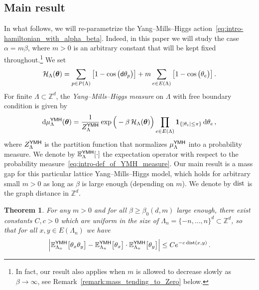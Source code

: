 \documentclass[11pt]{article}
\newtheorem{theorem}{Theorem}
\theoremstyle{definition}
\theoremstyle{remark}
\numberwithin{theorem}{section}
\newcommand{\bZ}{\mathbb Z}
\newcommand{\bE}{\mathbb E}
\newcommand{\Z}{\mathbb{Z}}
\newcommand{\one}{\boldsymbol{1}}
\begin{document}
    \subsection{Main result}
    In what follows, we will re-parametrize the Yang--Mills--Higgs action~\eqref{eq:intro-hamiltonian_with_alpha_beta}. Indeed, in this paper we will study the case $\alpha = m \beta$, where $m>0$ is an arbitrary constant that will be kept fixed throughout.\footnote{In fact, our result also applies when $m$ is allowed to decrease slowly as $\beta\to\infty$, see Remark~\ref{remark:mass_tending_to_Zero} below.}
    We set
    \begin{equation}
        \label{eq:intro_hamiltoniam_with_beta_and_mass}
        \mathcal{H}_{\Lambda}(\boldsymbol{\theta}) = \sum_{p\in P(\Lambda)} \big[1 - \cos\big({\sf d} \theta_p\big)\big] + m \sum_{e\in E(\Lambda)} \big[1- \cos\big(\theta_e\big)\big] \, .  
    \end{equation}
    For finite $\Lambda\subset \Z^d$, the \emph{Yang--Mills--Higgs measure} on $\Lambda$ with free boundary condition is given by
    \begin{equation}
        \label{eq:intro-def_of_YMH_measure}
        {\rm d}\mu_{\Lambda}^{\sf YMH}(\boldsymbol{\theta}) =  \frac{1}{Z_{\Lambda}^{\sf YMH}} \exp\Big(-\beta \, \mathcal{H}_{\Lambda}(\boldsymbol{\theta})\Big) \prod_{e\in E(\Lambda)} \one_{\{|\theta_e| \le \pi\}} \, {\rm d}\theta_e \, ,
    \end{equation}
    where $Z_{\Lambda}^{\sf YMH}$ is the partition function that normalizes $\mu_{\Lambda}^{\sf YMH}$ into a probability measure. We denote by $\bE_{\Lambda}^{\sf YMH}[\cdot]$ the expectation operator with respect to the probability measure~\eqref{eq:intro-def_of_YMH_measure}. Our main result is a mass gap for this particular lattice Yang--Mills--Higgs model, which holds for arbitrary small $m>0$ as long as $\beta$ is large enough (depending on $m$). We denote by $\text{\normalfont dist}$ is the graph distance in $\bZ^d$.
    \begin{theorem}
        \label{thm:exponential_clustering_in_lattice_YMH}
        For any $m>0$ and for all $\beta\ge \beta_0(d,m)$ large enough, there exist constants $C,c>0$ which are uniform in the size of $\Lambda_n = \{-n,\ldots,n\}^d \subset \bZ^d$, so that for all $x,y\in E(\Lambda_n)$ we have
        \[
        \Big|\bE_{\Lambda_n}^{\sf YMH}\big[\theta_x \theta_y\big] - \bE_{\Lambda_n}^{\sf YMH}\big[\theta_x \big]\cdot \bE_{\Lambda_n}^{\sf YMH}\big[ \theta_y\big]\Big| \le C e^{-c  \, \text{\normalfont dist}(x,y)} \, .
        \]
    \end{theorem}
\end{document}
